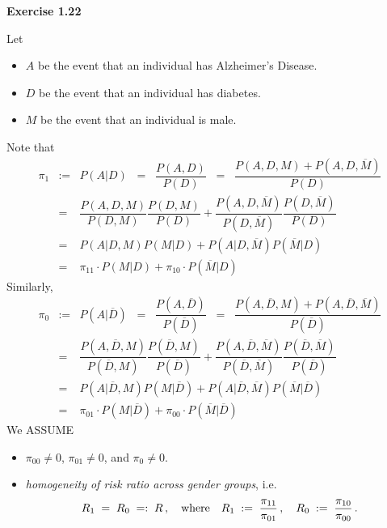 
\noindent
\textbf{Exercise 1.22}

\vskip 0.5cm
\noindent
Let
\begin{itemize}
\item 	$A$ be the event that an individual has Alzheimer's Disease.
\item 	$D$ be the event that an individual has diabetes.
\item 	$M$ be the event that an individual is male.
\end{itemize}
Note that
\begin{eqnarray*}
\pi_{1}
&:=&      P(A \vert D)
\;\;=\;\; \dfrac{P(A,D)}{P(D)}
\;\;=\;\; \dfrac{P(A,D,M) + P(A,D,\overline{M})}{P(D)} \\
&=&  \dfrac{P(A,D,M)}{P(D,M)}\dfrac{P(D,M)}{P(D)}
    +\dfrac{P(A,D,\overline{M})}{P(D,\overline{M})}\dfrac{P(D,\overline{M})}{P(D)}
\\
&=&  P(A \vert D,M) P(M \vert D) + P(A \vert D,\overline{M}) P(\overline{M} \vert D) \\
&=&  \pi_{11} \cdot P(M \vert D) + \pi_{10} \cdot P(\overline{M} \vert D)
\end{eqnarray*}
Similarly,
\begin{eqnarray*}
\pi_{0}
&:=&      P(A \vert \overline{D})
\;\;=\;\; \dfrac{P(A,\overline{D})}{P(\overline{D})}
\;\;=\;\; \dfrac{P(A,\overline{D},M) + P(A,\overline{D},\overline{M})}{P(\overline{D})} \\
&=&  \dfrac{P(A,\overline{D},M)}{P(\overline{D},M)}\dfrac{P(\overline{D},M)}{P(\overline{D})}
    +\dfrac{P(A,\overline{D},\overline{M})}{P(\overline{D},\overline{M})}
     \dfrac{P(\overline{D},\overline{M})}{P(\overline{D})}
\\
&=&   P(A \vert \overline{D},M) P(M \vert \overline{D})
    + P(A \vert \overline{D},\overline{M}) P(\overline{M} \vert \overline{D}) \\
&=&  \pi_{01} \cdot P(M \vert \overline{D}) + \pi_{00} \cdot P(\overline{M} \vert \overline{D})
\end{eqnarray*}
We ASSUME
\begin{itemize}
\item 	$\pi_{00} \neq 0$, $\pi_{01} \neq 0$, and $\pi_{0} \neq 0$.
\item 	\textit{homogeneity of risk ratio across gender groups}, i.e.
		\begin{equation}
		\label{homogeneity:riskRatio:genderGroups}
		R_{1} \; = \; R_{0} \; =: \; R\,,
		\quad\textnormal{where}\quad
		R_{1} \;:=\; \dfrac{\pi_{11}}{\pi_{01}}\,,\quad
		R_{0} \;:=\; \dfrac{\pi_{10}}{\pi_{00}}\,.
		\end{equation}
\end{itemize}
